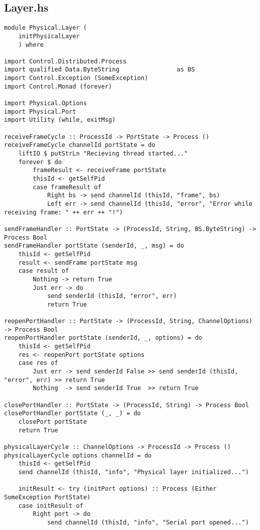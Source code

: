 \documentclass[russian,utf8,simple,emptystyle]{eskdtext}
\begin{document}
\subsection{Layer.hs}
\begin{lstlisting}
module Physical.Layer (
    initPhysicalLayer
    ) where

import Control.Distributed.Process
import qualified Data.ByteString                as BS
import Control.Exception (SomeException)
import Control.Monad (forever)

import Physical.Options
import Physical.Port
import Utility (while, exitMsg)

receiveFrameCycle :: ProcessId -> PortState -> Process () 
receiveFrameCycle channelId portState = do
    liftIO $ putStrLn "Recieving thread started..." 
    forever $ do
        frameResult <- receiveFrame portState 
        thisId <- getSelfPid
        case frameResult of 
            Right bs -> send channelId (thisId, "frame", bs)
            Left err -> send channelId (thisId, "error", "Error while receiving frame: " ++ err ++ "!")

sendFrameHandler :: PortState -> (ProcessId, String, BS.ByteString) -> Process Bool
sendFrameHandler portState (senderId, _, msg) = do 
    thisId <- getSelfPid
    result <- sendFrame portState msg
    case result of 
        Nothing -> return True
        Just err -> do
            send senderId (thisId, "error", err)
            return True

reopenPortHandler :: PortState -> (ProcessId, String, ChannelOptions) -> Process Bool 
reopenPortHandler portState (senderId, _, options) = do
    thisId <- getSelfPid
    res <- reopenPort portState options
    case res of
        Just err -> send senderId False >> send senderId (thisId, "error", err) >> return True
        Nothing  -> send senderId True  >> return True

closePortHandler :: PortState -> (ProcessId, String) -> Process Bool 
closePortHandler portState (_, _) = do 
    closePort portState
    return True

physicalLayerCycle :: ChannelOptions -> ProcessId -> Process ()
physicalLayerCycle options channelId = do
    thisId <- getSelfPid
    send channelId (thisId, "info", "Physical layer initialized...")

    initResult <- try (initPort options) :: Process (Either SomeException PortState)
    case initResult of 
        Right port -> do
            send channelId (thisId, "info", "Serial port opened...")


\end{lstlisting}
\end{document}
